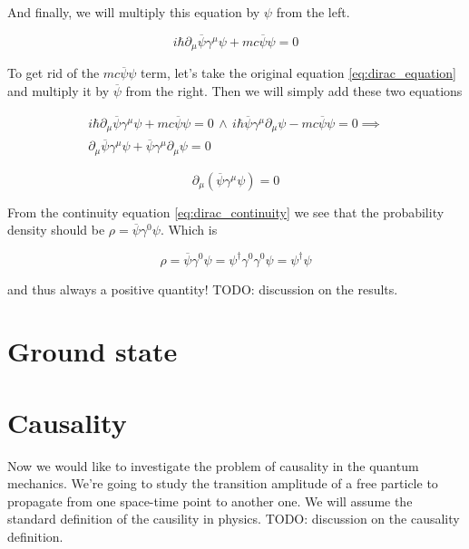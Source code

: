 And finally, we will multiply this equation by $\psi$ from the left.

\begin{equation}
    i \hbar \partial_{\mu} \overline{\psi} \gamma^{\mu} \psi + mc \overline{\psi} \psi = 0
\end{equation}

To get rid of the $mc \overline{\psi} \psi$ term, let's take the original equation \ref{eq:dirac_equation} and multiply it
by $\overline{\psi}$ from the right. Then we will simply add these two equations

\begin{equation*}
    \begin{gathered}
        i \hbar \partial_{\mu} \overline{\psi} \gamma^{\mu} \psi + mc \overline{\psi} \psi = 0 \, \land \,
        i \hbar \overline{\psi} \gamma^{\mu} \partial_{\mu} \psi - mc \overline{\psi} \psi = 0 \implies \\
        \partial_{\mu} \overline{\psi} \gamma^{\mu} \psi + \overline{\psi} \gamma^{\mu} \partial_{\mu} \psi = 0
    \end{gathered}
\end{equation*}

\begin{equation}
    \label{eq:dirac_continuity}
    \partial_{\mu} (\overline{\psi} \gamma^{\mu} \psi) = 0
\end{equation}

From the continuity equation \ref{eq:dirac_continuity} we see that the probability density should be $\rho = \overline{\psi} \gamma^{0} \psi$.
Which is

\begin{equation*}
    \rho = \overline{\psi} \gamma^{0} \psi = \psi^{\dagger} \gamma^{0} \gamma^{0} \psi = \psi^{\dagger} \psi
\end{equation*}

and thus always a positive quantity! TODO: discussion on the results.

\section{Ground state}

\section{Causality}

Now we would like to investigate the problem of causality in the quantum mechanics. We're going to study the transition
amplitude of a free particle to propagate from one space-time point to another one. We will assume the standard definition
of the causility in physics. TODO: discussion on the causality definition.

